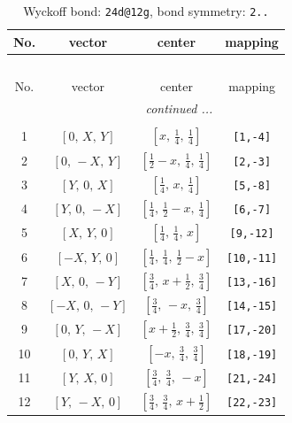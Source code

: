 \documentclass[fleqn,8pt]{jsarticle}
\begin{document}
\begin{longtable}{cccc}
\caption{Wyckoff bond: {\tt 24d@12g}, bond symmetry: {\tt 2..}}
 \\
 \hline \hline
No. & vector & center & mapping \\ \hline \endfirsthead

\multicolumn{3}{l}{\tablename\ \thetable{}} \\
 \hline \hline
No. & vector & center & mapping \\ \hline \endhead

 \hline \hline
\multicolumn{3}{r}{\footnotesize\it continued ...} \\ \endfoot

 \hline \hline
\multicolumn{3}{r}{} \\ \endlastfoot

1 & $\left[ 0,\, X,\, Y \right]$ & $\left[ x,\, \frac{1}{4},\, \frac{1}{4} \right]$ & {\tt [1,-4]} \\ \hline
2 & $\left[ 0,\, - X,\, Y \right]$ & $\left[ \frac{1}{2} - x,\, \frac{1}{4},\, \frac{1}{4} \right]$ & {\tt [2,-3]} \\ \hline
3 & $\left[ Y,\, 0,\, X \right]$ & $\left[ \frac{1}{4},\, x,\, \frac{1}{4} \right]$ & {\tt [5,-8]} \\ \hline
4 & $\left[ Y,\, 0,\, - X \right]$ & $\left[ \frac{1}{4},\, \frac{1}{2} - x,\, \frac{1}{4} \right]$ & {\tt [6,-7]} \\ \hline
5 & $\left[ X,\, Y,\, 0 \right]$ & $\left[ \frac{1}{4},\, \frac{1}{4},\, x \right]$ & {\tt [9,-12]} \\ \hline
6 & $\left[ - X,\, Y,\, 0 \right]$ & $\left[ \frac{1}{4},\, \frac{1}{4},\, \frac{1}{2} - x \right]$ & {\tt [10,-11]} \\ \hline
7 & $\left[ X,\, 0,\, - Y \right]$ & $\left[ \frac{3}{4},\, x + \frac{1}{2},\, \frac{3}{4} \right]$ & {\tt [13,-16]} \\ \hline
8 & $\left[ - X,\, 0,\, - Y \right]$ & $\left[ \frac{3}{4},\, - x,\, \frac{3}{4} \right]$ & {\tt [14,-15]} \\ \hline
9 & $\left[ 0,\, Y,\, - X \right]$ & $\left[ x + \frac{1}{2},\, \frac{3}{4},\, \frac{3}{4} \right]$ & {\tt [17,-20]} \\ \hline
10 & $\left[ 0,\, Y,\, X \right]$ & $\left[ - x,\, \frac{3}{4},\, \frac{3}{4} \right]$ & {\tt [18,-19]} \\ \hline
11 & $\left[ Y,\, X,\, 0 \right]$ & $\left[ \frac{3}{4},\, \frac{3}{4},\, - x \right]$ & {\tt [21,-24]} \\ \hline
12 & $\left[ Y,\, - X,\, 0 \right]$ & $\left[ \frac{3}{4},\, \frac{3}{4},\, x + \frac{1}{2} \right]$ & {\tt [22,-23]} \\ \hline

\end{longtable}
\end{document}
